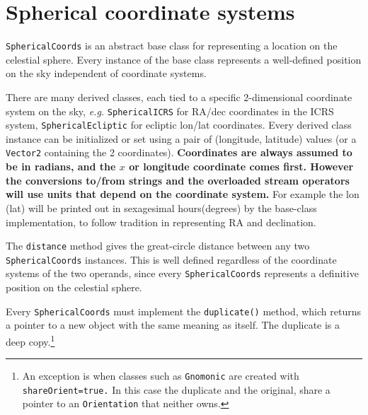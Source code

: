 \documentclass[11pt,preprint,flushrt]{aastex}
\begin{document}
\section{Spherical coordinate systems}
{\tt SphericalCoords} is an abstract base class for representing a location on the celestial sphere.  Every instance of the base class represents a well-defined position on the sky independent of coordinate systems.

There are many derived classes, each tied to a specific 2-dimensional coordinate system on the sky, {\it e.g.} {\tt SphericalICRS} for RA/dec coordinates in the ICRS system, {\tt SphericalEcliptic} for ecliptic lon/lat coordinates.  Every derived class instance can be initialized or set using a pair of (longitude, latitude) values (or a {\tt Vector2} containing the 2 coordinates).  {\bf Coordinates are always assumed to be in radians, and the $x$ or longitude coordinate comes first.  However the conversions to/from strings and the overloaded stream operators will use units that depend on the coordinate system.}  For example the lon (lat) will be printed out in sexagesimal hours(degrees) by the base-class implementation, to follow tradition in representing RA and declination.

The {\tt distance} method gives the great-circle distance between any two {\tt SphericalCoords} instances.  This is well defined regardless of the coordinate systems of the two operands, since every {\tt SphericalCoords} represents a definitive position on the celestial sphere.

Every {\tt SphericalCoords} must implement the {\tt duplicate()} method, which returns a pointer to a new object with the same meaning as itself.  The duplicate is a deep copy.\footnote{An exception is when classes such as {\tt Gnomonic} are created with {\tt shareOrient=true.}  In this case the duplicate and the original, share a pointer to an {\tt Orientation} that neither owns.}
\end{document}

